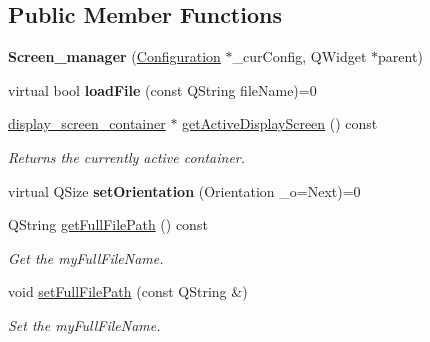 \subsection*{Public Member Functions}
\begin{DoxyCompactItemize}
\item 
\mbox{\label{classScreen__manager_a6aa095225e7d6c68c49257298b048686}} 
{\bfseries Screen\+\_\+manager} (\mbox{\hyperlink{classConfiguration}{Configuration}} $\ast$\+\_\+cur\+Config, Q\+Widget $\ast$parent)
\item 
\mbox{\label{classScreen__manager_a35b2be90ae610b77457cd83793e6a9b7}} 
virtual bool {\bfseries load\+File} (const Q\+String file\+Name)=0
\item 
\mbox{\label{classScreen__manager_a317d60e000518cd1af48d04dca139f43}} 
\mbox{\hyperlink{classdisplay__screen__container}{display\+\_\+screen\+\_\+container}} $\ast$ \mbox{\hyperlink{classScreen__manager_a317d60e000518cd1af48d04dca139f43}{get\+Active\+Display\+Screen}} () const
\begin{DoxyCompactList}\small\item\em Returns the currently active container. \end{DoxyCompactList}\item 
\mbox{\label{classScreen__manager_a26f4d66015d6788a69bf745309bfe93e}} 
virtual Q\+Size {\bfseries set\+Orientation} (Orientation \+\_\+o=Next)=0
\item 
\mbox{\label{classScreen__manager_a35fad2826491912a33af8f6b5192abc4}} 
Q\+String \mbox{\hyperlink{classScreen__manager_a35fad2826491912a33af8f6b5192abc4}{get\+Full\+File\+Path}} () const
\begin{DoxyCompactList}\small\item\em Get the my\+Full\+File\+Name. \end{DoxyCompactList}\item 
\mbox{\label{classScreen__manager_acb7b0f59376ccbc2038b832bba22b577}} 
void \mbox{\hyperlink{classScreen__manager_acb7b0f59376ccbc2038b832bba22b577}{set\+Full\+File\+Path}} (const Q\+String \&)
\begin{DoxyCompactList}\small\item\em Set the my\+Full\+File\+Name. \end{DoxyCompactList}\item 

\end{DoxyCompactItemize}
